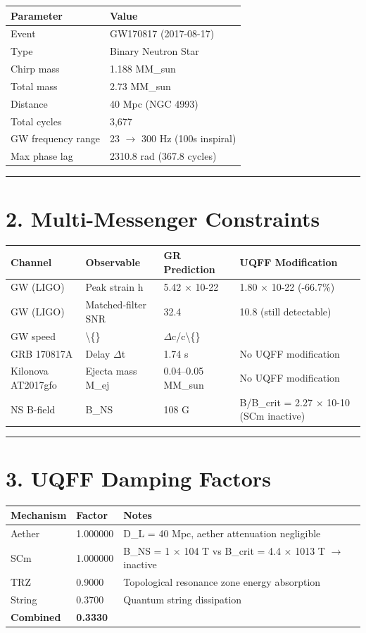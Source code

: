 \documentclass[11pt]{article}
\begin{document}
\begin{center}
\begin{longtable}{ll}
\toprule
Parameter & Value \tabularnewline
\midrule
\endhead
Event & GW170817 (2017-08-17) \tabularnewline
Type & Binary Neutron Star \tabularnewline
Chirp mass & 1.188 MM\_sun \tabularnewline
Total mass & 2.73 MM\_sun \tabularnewline
Distance & 40 Mpc (NGC 4993) \tabularnewline
Total cycles & 3,677 \tabularnewline
GW frequency range & 23 $\to$ 300 Hz (100s inspiral) \tabularnewline
Max phase lag & 2310.8 rad (367.8 cycles) \tabularnewline
\bottomrule
\end{longtable}
\end{center}

\noindent\rule{\textwidth}{0.4pt}

\section*{2. Multi-Messenger Constraints}

\begin{center}
\begin{longtable}{llll}
\toprule
Channel & Observable & GR Prediction & UQFF Modification \tabularnewline
\midrule
\endhead
GW (LIGO) & Peak strain h & 5.42 $\times$ 10-22 & 1.80 $\times$ 10-22 (-66.7\%) \tabularnewline
GW (LIGO) & Matched-filter SNR & 32.4 & 10.8 (still detectable) \tabularnewline
GW speed & \textbackslash\{\} & $\Delta$c/c\textbackslash\{\} &  \tabularnewline
GRB 170817A & Delay $\Delta$t & 1.74 s & No UQFF modification \tabularnewline
Kilonova AT2017gfo & Ejecta mass M\_ej & 0.04--0.05 MM\_sun & No UQFF modification \tabularnewline
NS B-field & B\_NS & 108 G & B/B\_crit = 2.27 $\times$ 10-10 (SCm inactive) \tabularnewline
\bottomrule
\end{longtable}
\end{center}

\noindent\rule{\textwidth}{0.4pt}

\section*{3. UQFF Damping Factors}

\begin{center}
\begin{longtable}{lll}
\toprule
Mechanism & Factor & Notes \tabularnewline
\midrule
\endhead
Aether & 1.000000 & D\_L = 40 Mpc, aether attenuation negligible \tabularnewline
SCm & 1.000000 & B\_NS = 1 $\times$ 104 T vs B\_crit = 4.4 $\times$ 1013 T $\to$ inactive \tabularnewline
TRZ & 0.9000 & Topological resonance zone energy absorption \tabularnewline
String & 0.3700 & Quantum string dissipation \tabularnewline
\textbf{Combined} & \textbf{0.3330} &  \tabularnewline
\bottomrule
\end{longtable}
\end{center}
\end{document}
